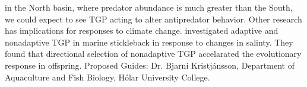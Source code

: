 \documentclass[12pt]{extarticle}
\begin{document}
in the North basin, where predator abundance is much greater than the South, we could expect to see TGP acting to alter antipredator behavior. Other research has implications for responses to climate change. \citet{Heckwolf2018} investigated adaptive and nonadaptive TGP in marine stickleback in response to changes in salinty. They found that directional selection of nonadaptive TGP accelarated the evolutionary response in offspring.
Proposed Guides: Dr. Bjarni Kristj\'ansson, Department of Aquaculture and Fish Biology, H\'olar University College.

\end{document}
